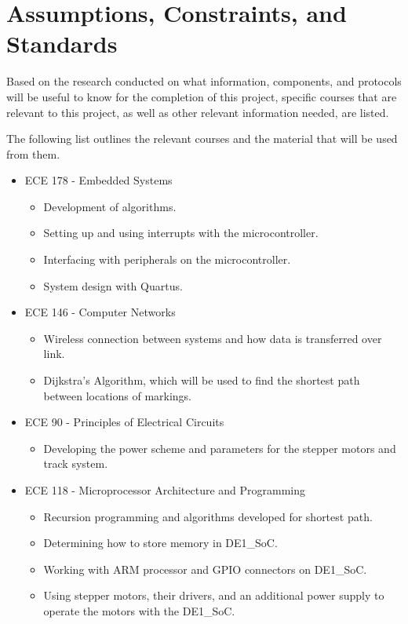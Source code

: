 \section{Assumptions, Constraints, and Standards}
Based on the research conducted on what information, components, and protocols will be useful to know for the completion of this project, specific courses that are relevant to this project, as well as other relevant information needed, are listed.\par
The following list outlines the relevant courses and the material that will be used from them.\par

\begin{itemize}
	\item ECE 178 - Embedded Systems
	\begin{itemize}
		\item Development of algorithms.
		\item Setting up and using interrupts with the microcontroller.
		\item Interfacing with peripherals on the microcontroller.
		\item System design with Quartus.
	\end{itemize}
	\item ECE 146 - Computer Networks
	\begin{itemize}
		\item Wireless connection between systems and how data is transferred over link.
		\item Dijkstra's Algorithm, which will be used to find the shortest path between locations of markings.
	\end{itemize}
	\item ECE 90 - Principles of Electrical Circuits
	\begin{itemize}
		\item Developing the power scheme and parameters for the stepper motors and track system.
		\end{itemize}
	\item ECE 118 - Microprocessor Architecture and Programming
	\begin{itemize}
		\item Recursion programming and algorithms developed for shortest path.
		\item Determining how to store memory in DE1\_SoC.
		\item Working with ARM processor and GPIO connectors on DE1\_SoC.
		\item Using stepper motors, their drivers, and an additional power supply to operate the motors with the DE1\_SoC.

\end{itemize}
\end{itemize}
